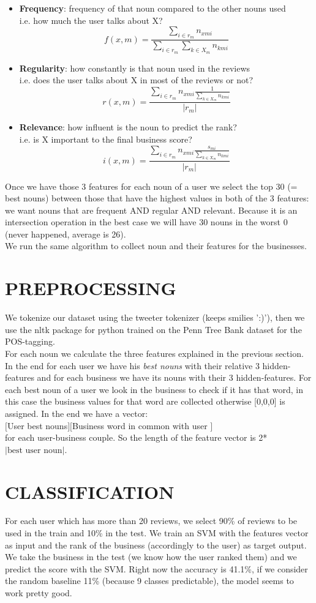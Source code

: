 \documentclass[a4paper, 10pt, conference]{ieeeconf}      %
\begin{document}
\begin{itemize}
	\item \textbf{Frequency}: frequency of that noun compared to the other nouns used\\
	i.e. how much the user talks about X?
	\[ f(x,m)= \frac{\sum_{i \in r_m}n_{xmi}}{\sum_{i \in r_m}\sum_{k \in X_m} n_{kmi}} \]
	\item \textbf{Regularity}: how constantly is that noun used in the reviews\\
	i.e. does the user talks about X in most of the reviews or not?
	\[ r(x,m)= \frac{\sum_{i \in r_m}
		n_{xmi}  \frac{1}{\sum_{k \in X_m}n_{kmi}}}	
				{|r_m|} \]
	\item \textbf{Relevance}: how influent is the noun to predict the rank?\\
	i.e. is X important to the final business score?
	\[ i(x,m)= \frac{\sum_{i \in r_m}
		n_{xmi}  \frac{s_{mi}}{\sum_{k \in X_m}n_{kmi}}}	
	{|r_m|} \]
\end{itemize}
Once we have those 3 features for each noun of a user we select the top 30 (= best nouns) between those that have the highest values in both of the 3 features: we want nouns that are frequent AND regular AND relevant. Because it is an intersection operation in the best case we will have 30 nouns in the worst 0 (never happened, average is 26).\\
We run the same algorithm to collect noun and their features for the businesses.
\section{PREPROCESSING}
We tokenize our dataset using the tweeter tokenizer (keeps smilies ':)'), then we use the nltk package for python trained on the  Penn Tree Bank dataset for the POS-tagging.\\
For each noun we calculate the three features explained in the previous section.
In the end for each user we have his\textit{ best nouns} with their relative 3 hidden-features and for each business we have its nouns with their 3 hidden-features. For each best noun of a user we look in the business to check if it has that word, in this case the business values for that word are collected otherwise [0,0,0] is assigned.
In the end we have a vector:\\
$[$User best nouns$][$Business word in common with user $]$\\
for each user-business couple.
So the length of the feature vector is 2* $|\text{best user noun}|$.
\section{CLASSIFICATION}
For each user which has more than 20 reviews, we select 90\% of reviews to be used in the train and 10\% in the test.
We train an SVM with the features vector as input and the rank of the business (accordingly to the user) as target output.\\
We take the business in the test (we know how the user ranked them) and we predict the score with the SVM. Right now the accuracy is 41.1\%, if we consider the random baseline 11\% (because 9 classes predictable), the model seems to work pretty good.
\end{document}
